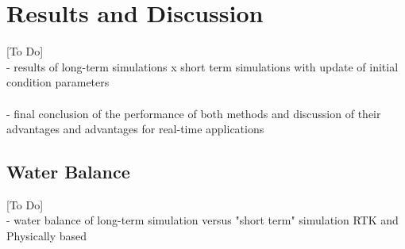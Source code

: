 \chapter{Results and Discussion}
[To Do]\\

- results of long-term simulations x short term simulations with update of initial condition parameters\\\\


- final conclusion of the performance of both methods and discussion of their advantages and advantages for real-time applications\\



\section{Water Balance}
[To Do]\\

- water balance of long-term simulation versus "short term" simulation
RTK and Physically based\\




